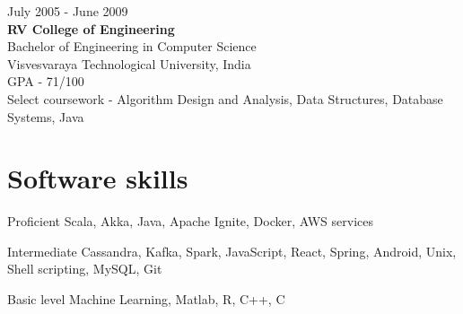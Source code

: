 \documentclass{tccv}
\begin{document}
{\hfill\sc July 2005 - June 2009}\\
\textbf{RV College of Engineering}\\
Bachelor of Engineering in Computer Science\\
Visvesvaraya Technological University, India\\
GPA - 71/100\\
Select coursework - Algorithm Design and Analysis, Data Structures, Database Systems, Java\\ 


\vspace{-0.2in}
\section{Software skills}
\begin{factlist}
\item{Proficient}
     {Scala, Akka, Java, Apache Ignite, Docker, AWS services}

\item{Intermediate}
     {Cassandra, Kafka, Spark, JavaScript, React, Spring, Android, Unix, Shell scripting, MySQL, Git}

\item{Basic level}
     {Machine Learning, Matlab, R, C++, C}
\end{factlist}
\end{document}
